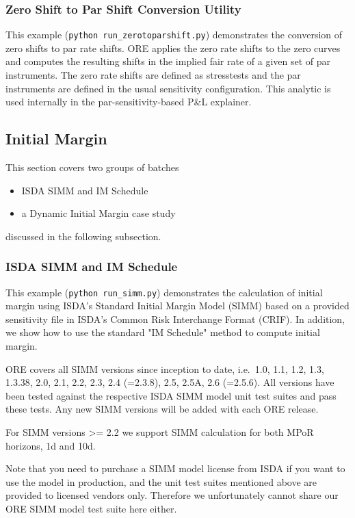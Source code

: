 \subsubsection{Zero Shift to Par Shift Conversion Utility}
\label{example:marketrisk_zerotoparshift}

This example ({\tt python run\_zerotoparshift.py}) demonstrates the conversion of zero shifts to par rate
shifts. ORE applies the zero rate shifts to the zero curves and computes the resulting shifts in the
implied fair rate of a given set of par instruments.  The zero rate shifts are defined as stresstests
and the par instruments are defined in the usual sensitivity configuration.
This analytic is used internally in the par-sensitivity-based P\&L explainer.

\subsection{Initial Margin}\label{example:initialmargin}

This section covers two groups of batches
\begin{itemize}
\item ISDA SIMM and IM Schedule
\item a Dynamic Initial Margin case study
\end{itemize}
discussed in the following subsection.

\subsubsection{ISDA SIMM and IM Schedule}

This example ({\tt python run\_simm.py}) demonstrates the calculation of initial margin using ISDA's Standard Initial Margin Model (SIMM) based on a provided
sensitivity file in ISDA's Common Risk Interchange Format (CRIF). In addition, we show how to use the standard "IM Schedule" method to compute
initial margin.

ORE covers all SIMM versions since inception to date, i.e.\ 1.0, 1.1, 1.2, 1.3, 1.3.38, 2.0, 2.1, 2.2, 2.3, 2.4 (=2.3.8), 2.5, 2.5A, 2.6 (=2.5.6).
All versions have been tested against the respective ISDA SIMM model unit test suites and pass these tests.
Any new SIMM versions will be added with each ORE release.

For SIMM versions >= 2.2 we support SIMM calculation for both MPoR horizons, 1d and 10d.

Note that you need to purchase a SIMM model license from ISDA if you want to use the model in production, and the unit test
suites mentioned above are provided to licensed vendors only. Therefore we unfortunately cannot share our ORE SIMM model
test suite here either.

